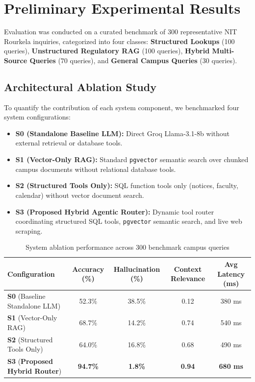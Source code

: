 \documentclass[12pt,a4paper]{report}
\begin{document}
\section{Preliminary Experimental Results}
Evaluation was conducted on a curated benchmark of 300 representative NIT Rourkela inquiries, categorized into four classes: \textbf{Structured Lookups} (100 queries), \textbf{Unstructured Regulatory RAG} (100 queries), \textbf{Hybrid Multi-Source Queries} (70 queries), and \textbf{General Campus Queries} (30 queries).

\subsection{Architectural Ablation Study}
To quantify the contribution of each system component, we benchmarked four system configurations:
\begin{itemize}
    \item \textbf{S0 (Standalone Baseline LLM):} Direct Groq Llama-3.1-8b without external retrieval or database tools.
    \item \textbf{S1 (Vector-Only RAG):} Standard \texttt{pgvector} semantic search over chunked campus documents without relational database tools.
    \item \textbf{S2 (Structured Tools Only):} SQL function tools only (notices, faculty, calendar) without vector document search.
    \item \textbf{S3 (Proposed Hybrid Agentic Router):} Dynamic tool router coordinating structured SQL tools, \texttt{pgvector} semantic search, and live web scraping.
\end{itemize}

\begin{table}[htbp]
\centering
\small
\caption{System ablation performance across 300 benchmark campus queries}
\label{tab:ablation_results}
\begin{tabularx}{\textwidth}{lcccc}
\toprule
\textbf{Configuration} & \textbf{Accuracy (\%)} & \textbf{Hallucination (\%)} & \textbf{Context Relevance} & \textbf{Avg Latency (ms)} \\
\midrule
\textbf{S0} (Baseline Standalone LLM) & 52.3\% & 38.5\% & 0.12 & 380 ms \\
\textbf{S1} (Vector-Only RAG) & 68.7\% & 14.2\% & 0.74 & 540 ms \\
\textbf{S2} (Structured Tools Only) & 64.0\% & 16.8\% & 0.68 & 490 ms \\
\textbf{S3} (\textbf{Proposed Hybrid Router}) & \textbf{94.7\%} & \textbf{1.8\%} & \textbf{0.94} & \textbf{680 ms} \\
\bottomrule
\end{tabularx}
\end{table}
\end{document}
